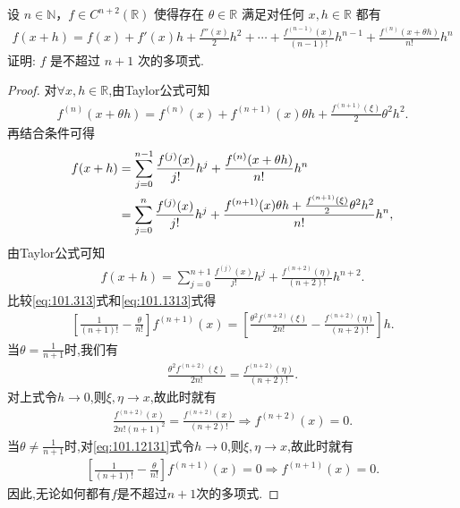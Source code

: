 \documentclass[../../main.tex]{subfiles}
\begin{document}
\begin{example}
设 \( n \in \mathbb{N} \)，\( f \in C^{n+2}(\mathbb{R}) \) 使得存在 \( \theta \in \mathbb{R} \) 满足对任何 \( x, h \in \mathbb{R} \) 都有
\begin{align*}
f(x + h) = f(x) + f'(x)h + \frac{f''(x)}{2}h^2 + \cdots + \frac{f^{(n-1)}(x)}{(n-1)!}h^{n-1} + \frac{f^{(n)}(x + \theta h)}{n!}h^n
\end{align*}
证明: \( f \) 是不超过 \( n + 1 \) 次的多项式.
\end{example}
\begin{proof}
对$\forall x,h\in \mathbb{R}$,由Taylor公式可知
\begin{align*}
f^{(n)}(x+\theta h) =f^{(n)}(x) +f^{(n+1)}(x) \theta h+\frac{f^{(n+1)}(\xi)}{2}\theta^2 h^2.
\end{align*}
再结合条件可得
\begin{align}
f(x+h) &=\sum_{j=0}^{n-1}\frac{f^{(j)}(x)}{j!}h^j+\frac{f^{(n)}(x+\theta h)}{n!}h^n \notag \\
&=\sum_{j=0}^n\frac{f^{(j)}(x)}{j!}h^j+\frac{f^{(n+1)}(x) \theta h+\frac{f^{(n+1)}(\xi)}{2}\theta^2 h^2}{n!}h^n, \label{eq:101.313}
\end{align}
由Taylor公式可知
\begin{align}
f(x+h) =\sum_{j=0}^{n+1}\frac{f^{(j)}(x)}{j!}h^j+\frac{f^{(n+2)}(\eta)}{(n+2)!}h^{n+2}. \label{eq:101.1313}
\end{align}
比较\eqref{eq:101.313}式和\eqref{eq:101.1313}式得
\begin{align}
\left[ \frac{1}{(n+1)!}-\frac{\theta}{n!} \right] f^{(n+1)}(x) =\left[ \frac{\theta^2 f^{(n+2)}(\xi)}{2n!}-\frac{f^{(n+2)}(\eta)}{(n+2)!} \right] h. \label{eq:101.12131}
\end{align}
当$\theta =\frac{1}{n+1}$时,我们有
\begin{align*}
\frac{\theta^2 f^{(n+2)}(\xi)}{2n!}=\frac{f^{(n+2)}(\eta)}{(n+2)!}.
\end{align*}
对上式令$h\rightarrow 0$,则$\xi,\eta \rightarrow x$,故此时就有
\begin{align*}
\frac{f^{(n+2)}(x)}{2n!(n+1)^2}=\frac{f^{(n+2)}(x)}{(n+2)!}\Rightarrow f^{(n+2)}(x) =0.
\end{align*}
当$\theta \ne \frac{1}{n+1}$时,对\eqref{eq:101.12131}式令$h\rightarrow 0$,则$\xi,\eta \rightarrow x$,故此时就有
\begin{align*}
\left[ \frac{1}{(n+1)!}-\frac{\theta}{n!} \right] f^{(n+1)}(x) =0\Rightarrow f^{(n+1)}(x) =0.
\end{align*}
因此,无论如何都有$f$是不超过$n+1$次的多项式.
\end{proof}
\end{document}
